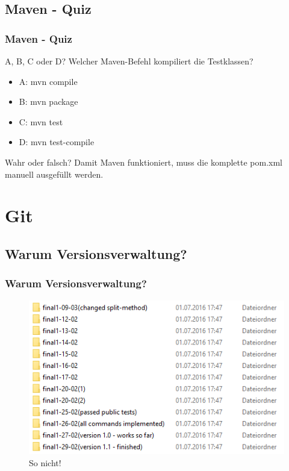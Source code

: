 \documentclass[18pt]{beamer}
\begin{document}
	\subsection{Maven - Quiz}
	\begin{frame}
		\frametitle{Maven - Quiz}
		\begin{block}{A, B, C oder D?}
			Welcher Maven-Befehl kompiliert die Testklassen?
			\begin{itemize}
				\item A: mvn compile
				\item B: mvn package
				\item C: mvn test
				\item D: mvn test-compile
			\end{itemize}
		\end{block}
		\pause
		\begin{block}{Wahr oder falsch?}
			Damit Maven funktioniert, muss die komplette pom.xml manuell ausgefüllt werden. 
		\end{block}
	\end{frame}


\section{Git}
	\subsection{Warum Versionsverwaltung?}
	\begin{frame}
		\frametitle{Warum Versionsverwaltung?}
		\begin{figure}
			\includegraphics[scale=0.7]{./pics/tut0/bad-version-management.png}
			\linebreak
			\centering 			So nicht!
		\end{figure}	
	\end{frame}
	
\end{document}
